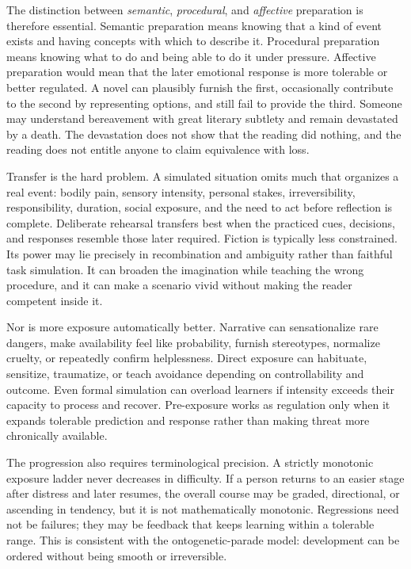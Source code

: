 \documentclass[11pt]{article}
\begin{document}
The distinction between \emph{semantic}, \emph{procedural}, and \emph{affective} preparation is therefore essential. Semantic preparation means knowing that a kind of event exists and having concepts with which to describe it. Procedural preparation means knowing what to do and being able to do it under pressure. Affective preparation would mean that the later emotional response is more tolerable or better regulated. A novel can plausibly furnish the first, occasionally contribute to the second by representing options, and still fail to provide the third. Someone may understand bereavement with great literary subtlety and remain devastated by a death. The devastation does not show that the reading did nothing, and the reading does not entitle anyone to claim equivalence with loss.

Transfer is the hard problem. A simulated situation omits much that organizes a real event: bodily pain, sensory intensity, personal stakes, irreversibility, responsibility, duration, social exposure, and the need to act before reflection is complete. Deliberate rehearsal transfers best when the practiced cues, decisions, and responses resemble those later required. Fiction is typically less constrained. Its power may lie precisely in recombination and ambiguity rather than faithful task simulation. It can broaden the imagination while teaching the wrong procedure, and it can make a scenario vivid without making the reader competent inside it.

Nor is more exposure automatically better. Narrative can sensationalize rare dangers, make availability feel like probability, furnish stereotypes, normalize cruelty, or repeatedly confirm helplessness. Direct exposure can habituate, sensitize, traumatize, or teach avoidance depending on controllability and outcome. Even formal simulation can overload learners if intensity exceeds their capacity to process and recover. Pre-exposure works as regulation only when it expands tolerable prediction and response rather than making threat more chronically available.

The progression also requires terminological precision. A strictly monotonic exposure ladder never decreases in difficulty. If a person returns to an easier stage after distress and later resumes, the overall course may be graded, directional, or ascending in tendency, but it is not mathematically monotonic. Regressions need not be failures; they may be feedback that keeps learning within a tolerable range. This is consistent with the ontogenetic-parade model: development can be ordered without being smooth or irreversible.
\end{document}
